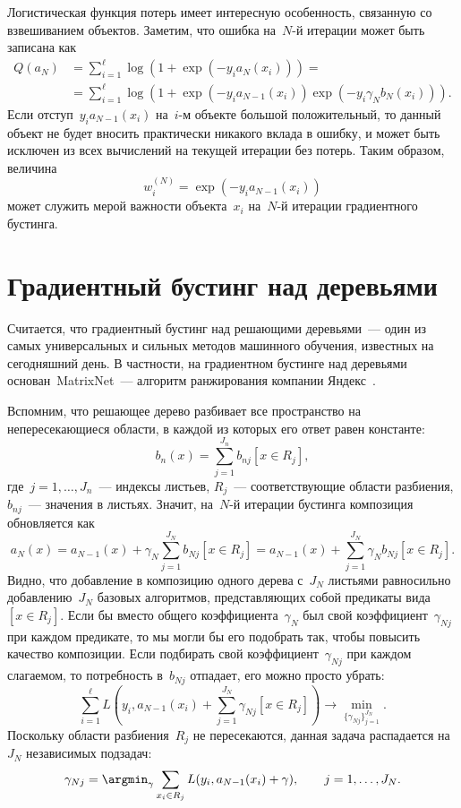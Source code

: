 \documentclass[12pt,fleqn]{article}
\begin{document}
Логистическая функция потерь имеет интересную особенность,
связанную со взвешиванием объектов.
Заметим, что ошибка на~$N$-й итерации может быть записана как
\begin{align*}
    Q(a_N)
    &=
    \sum_{i = 1}^{\ell}
        \log \left(
            1 + \exp(
                -y_i a_N(x_i)
            )
        \right)
    =\\
    &=
    \sum_{i = 1}^{\ell}
        \log \left(
            1
            +
            \exp(
                -y_i a_{N - 1}(x_i)
            )
            \exp(
                -y_i \gamma_N b_N(x_i)
            )
        \right).
\end{align*}
Если отступ~$y_i a_{N - 1}(x_i)$ на~$i$-м объекте большой положительный,
то данный объект не будет вносить практически никакого вклада в ошибку,
и может быть исключен из всех вычислений на текущей итерации
без потерь.
Таким образом, величина
\[
    w_i^{(N)}
    =
    \exp(
        -y_i a_{N - 1}(x_i)
    )
\]
может служить мерой важности объекта~$x_i$ на~$N$-й итерации градиентного бустинга.

\section{Градиентный бустинг над деревьями}
Считается, что градиентный бустинг над решающими деревьями~---
один из самых универсальных и сильных методов машинного обучения,
известных на сегодняшний день.
В частности, на градиентном бустинге над деревьями основан~MatrixNet~---
алгоритм ранжирования компании Яндекс~\cite{yandex_slides}.

Вспомним, что решающее дерево разбивает все пространство на непересекающиеся области,
в каждой из которых его ответ равен константе:
\[
    b_n(x)
    =
    \sum_{j = 1}^{J_n}
        b_{nj}
        [x \in R_j],
\]
где~$j = 1, \dots, J_n$~--- индексы листьев,
$R_j$~--- соответствующие области разбиения,
$b_{nj}$~--- значения в листьях.
Значит, на~$N$-й итерации бустинга композиция обновляется как
\[
    a_N(x)
    =
    a_{N - 1}(x)
    +
    \gamma_N
    \sum_{j = 1}^{J_N}
        b_{Nj}
        [x \in R_j]
    =
    a_{N - 1}(x)
    +
    \sum_{j = 1}^{J_N}
        \gamma_N
        b_{Nj}
        [x \in R_j].
\]
Видно, что добавление в композицию одного дерева с~$J_N$ листьями равносильно
добавлению~$J_N$ базовых алгоритмов, представляющих собой предикаты вида~$[x \in R_j]$.
Если бы вместо общего коэффициента~$\gamma_N$ был свой коэффициент~$\gamma_{Nj}$
при каждом предикате, то мы могли бы его подобрать так, чтобы повысить качество композиции.
Если подбирать свой коэффициент~$\gamma_{Nj}$ при каждом слагаемом, то потребность в~$b_{Nj}$ отпадает,
его можно просто убрать:
\[
    \sum_{i = 1}^{\ell}
        L\left(
            y_i,
            a_{N - 1}(x_i)
            +
            \sum_{j = 1}^{J_N}
                \gamma_{Nj}
                [x \in R_j]
        \right)
    \to
    \min_{\{\gamma_{Nj}\}_{j = 1}^{J_N}}.
\]
Поскольку области разбиения~$R_j$ не пересекаются,
данная задача распадается на~$J_N$ независимых подзадач:
\[
    \gamma_{Nj}
    =
    \argmin_\gamma
        \sum_{x_i \in R_j}
            L(y_i, a_{N - 1}(x_i) + \gamma),
    \qquad
    j = 1, \dots, J_N.
\]
\end{document}
